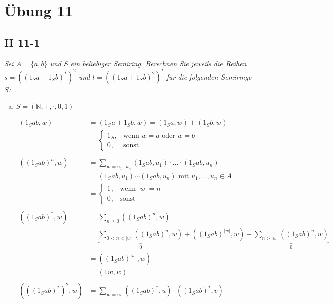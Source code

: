 \documentclass{scrartcl}
\begin{document}
\section{Übung 11}

\subsection{H 11-1}

\textsl{Sei $A = \{a, b\}$ und $S$ ein beliebiger Semiring. Berechnen Sie jeweils die Reihen $s = ((1_S a + 1_S b)^*)^2$ und $t = ((1_S a + 1_S b)^2)^*$ für die folgenden Semiringe $S$:}

\begin{enumerate}[(a)]
    \item $S = (\mathbb{N}, +, \cdot, 0, 1)$

      \begin{align*}
        (1_S ab, w) &= (1_S a + 1_S b, w) = (1_S a, w) + (1_S b, w)\\
          &= \begin{cases}
            1_S, &\text{wenn } w = a \text{ oder } w = b\\
            0,   &\text{sonst}
          \end{cases}
          \\
        \\
        ((1_S ab)^n, w) &=
          \sum_{w = u_1 \cdots u_n} (1_S ab, u_1) \cdot \ldots \cdot (1_S ab, u_n)\\
          &= (1_S ab, u_1) \cdots (1_S ab, u_n) \text{ mit } u_1, \ldots, u_n \in A\\
          &= \begin{cases}
            1, &\text{wenn } |w| = n\\
            0, &\text{sonst}
          \end{cases}
          \\
        \\
        ((1_S ab)^*, w) &= \sum_{n \geq 0} ((1_S ab)^n, w)\\
          &= \underbrace{\sum_{0 < n < |w|} ((1_S ab)^n, w)}_{0}
            + ((1_S ab)^{|w|}, w)
            + \underbrace{\sum_{n > |w|} ((1_S ab)^n, w)}_{0}\\
          &= ((1_S ab)^{|w|}, w)\\
          &= (1w, w)\\
        \\
        (((1_S ab)^*)^2, w) &= \sum_{w = uv} ((1_S ab)^*, u) \cdot ((1_S ab)^*, v)\\

\end{align*}
\end{enumerate}
\end{document}
